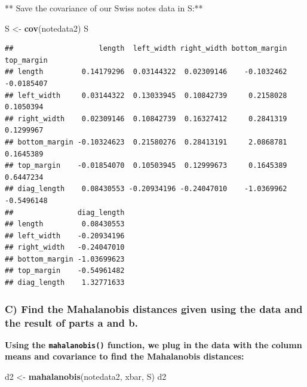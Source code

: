 \documentclass[
]{article}
\newenvironment{Shaded}{\begin{snugshade}}{\end{snugshade}}
\newcommand{\KeywordTok}[1]{\textcolor[rgb]{0.13,0.29,0.53}{\textbf{#1}}}
\newcommand{\NormalTok}[1]{#1}
\newcommand{\StringTok}[1]{\textcolor[rgb]{0.31,0.60,0.02}{#1}}
\begin{document}
** Save the covariance of our Swiss notes data in S:**

\begin{Shaded}
\begin{Highlighting}[]
\NormalTok{S <-}\StringTok{ }\KeywordTok{cov}\NormalTok{(notedata2)}
\NormalTok{S}
\end{Highlighting}
\end{Shaded}

\begin{verbatim}
##                    length  left_width right_width bottom_margin top_margin
## length         0.14179296  0.03144322  0.02309146    -0.1032462 -0.0185407
## left_width     0.03144322  0.13033945  0.10842739     0.2158028  0.1050394
## right_width    0.02309146  0.10842739  0.16327412     0.2841319  0.1299967
## bottom_margin -0.10324623  0.21580276  0.28413191     2.0868781  0.1645389
## top_margin    -0.01854070  0.10503945  0.12999673     0.1645389  0.6447234
## diag_length    0.08430553 -0.20934196 -0.24047010    -1.0369962 -0.5496148
##               diag_length
## length         0.08430553
## left_width    -0.20934196
## right_width   -0.24047010
## bottom_margin -1.03699623
## top_margin    -0.54961482
## diag_length    1.32771633
\end{verbatim}

\hypertarget{c-find-the-mahalanobis-distances-given-using-the-data-and-the-result-of-parts-a-and-b.}{%
\subsubsection{C) Find the Mahalanobis distances given using the data
and the result of parts a and
b.}\label{c-find-the-mahalanobis-distances-given-using-the-data-and-the-result-of-parts-a-and-b.}}

\textbf{Using the \texttt{mahalanobis()} function, we plug in the data
with the column means and covariance to find the Mahalanobis distances:}

\begin{Shaded}
\begin{Highlighting}[]
\NormalTok{d2 <-}\StringTok{ }\KeywordTok{mahalanobis}\NormalTok{(notedata2, xbar, S)}
\NormalTok{d2}
\end{Highlighting}
\end{Shaded}
\end{document}
